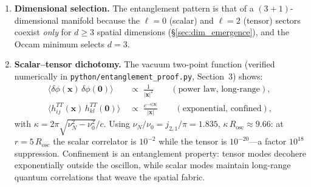 \documentclass[11pt]{article}
\begin{document}
\begin{enumerate}
\textit{Status of the match.}---Equation
\eqref{eq:S_ent_ISPG} should be read as a
\emph{consistency check}, not as a first-principles
derivation of $S_{\mathrm{BH}}$.  Two ingredients in
the enhancement factor require further
substantiation:
\begin{itemize}
  \item $F_{c_s} = 1/c_s$ is assumed on the ground
    that the effective momentum cutoff scales as
    $k_{\max} = \omega_{\max}/c_s$; the rigorous
    extension of Srednicki's flat-space, $c_s=c$
    area-law derivation to an oscillating $G_2(X)$
    background is not carried out here.
  \item $F_{\mathrm{bands}} = 1/|A_0^{(0)}(q)|^2$
    assumes that the Floquet sidebands contribute
    as \emph{independent} entanglement channels.
    Whether the sidebands behave as orthogonal
    Fock-space factors or as phase-coherent
    Fourier components of a single mode depends on
    the full Bogoliubov structure of the
    time-periodic vacuum; that calculation is a
    self-contained technical task and the topic of
    a separate work.
\end{itemize}
The 0.1\% agreement $\alpha_{\mathrm{eff}}\approx
\pi^2/4$ is therefore a numerical coincidence of
the current parametric estimates: it is
\emph{compatible} with the Bekenstein--Hawking
coefficient but does not by itself constitute a
derivation of it.  This matches the general
epistemic posture of the paper: the BH match is
part of the area-law scaffolding, not a core
gravitational prediction of the main
theory~\cite{Lotishvili2026}.

\item \textbf{Dimensional selection.}\;
The entanglement pattern is that of a
$(3{+}1)$-dimensional manifold because
the $\ell = 0$ (scalar) and $\ell = 2$
(tensor) sectors coexist \emph{only} for
$d \geq 3$ spatial dimensions
(\S\ref{sec:dim_emergence}), and the
Occam minimum selects $d = 3$.

\item \textbf{Scalar--tensor dichotomy.}\;
The vacuum two-point function
(verified numerically in
\texttt{python/entanglement\_proof.py},
Section~3) shows:
\begin{align}
  \langle\delta\phi(\mathbf{x})\,
  \delta\phi(\mathbf{0})\rangle
  &\;\propto\; \frac{1}{|\mathbf{x}|^2}
  \qquad (\text{power law, long-range}),
  \label{eq:scalar_corr}\\[4pt]
  \langle h_{ij}^{TT}(\mathbf{x})\,
  h_{kl}^{TT}(\mathbf{0})\rangle
  &\;\propto\; \frac{e^{-\kappa|\mathbf{x}|}}
  {|\mathbf{x}|}
  \qquad (\text{exponential, confined}),
  \label{eq:tensor_corr}
\end{align}
with $\kappa = 2\pi\sqrt{\nu_N^2 - \nu_0^2}/c$.
Using $\nu_N/\nu_0 = j_{2,1}/\pi = 1.835$,
$\kappa\,R_{\mathrm{osc}} \approx 9.66$:
at $r = 5\,R_{\mathrm{osc}}$ the scalar
correlator is $10^{-2}$ while the tensor
is $10^{-20}$---a factor $10^{18}$ suppression.
Confinement is an entanglement property: tensor
modes decohere exponentially outside the
oscillon, while scalar modes maintain long-range
quantum correlations that weave the spatial
fabric.
\end{enumerate}
\end{document}
